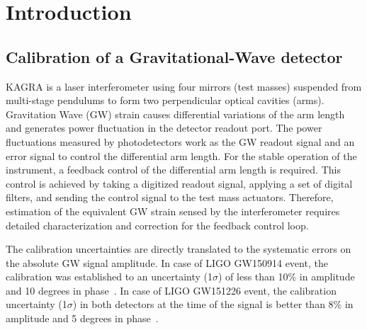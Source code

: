 
\chapter{Introduction} %

\label{Chapter1} %




\section{Calibration of a Gravitational-Wave detector}

KAGRA is a laser interferometer using four mirrors (test masses) suspended 
from multi-stage pendulums to form two perpendicular optical cavities (arms).
Gravitation Wave (GW) strain causes differential variations of the arm length
and generates power fluctuation in the detector readout port. 
The power fluctuations measured by photodetectors work as the GW readout 
signal and an error signal to control the differential arm length. 
For the stable operation of the instrument, a feedback control of the 
differential arm length is required. This control is achieved by taking 
a digitized readout signal, applying a set of digital filters, and sending 
the control signal to the test mass actuators. Therefore, estimation 
of the equivalent GW strain sensed by the interferometer requires 
detailed characterization and correction for the feedback control loop.

The calibration uncertainties are directly translated to the systematic 
errors on the absolute GW signal amplitude. In case of LIGO GW150914 event, 
the calibration was established to an uncertainty (1$\sigma$) of less than 
10\% in amplitude and 10 degrees in phase~\cite{GW150914}.
In case of LIGO GW151226 event, the calibration uncertainty (1$\sigma$) 
in both detectors at the time of the signal is better than 8\% 
in amplitude and 5 degrees in phase~\cite{GW151226}.

